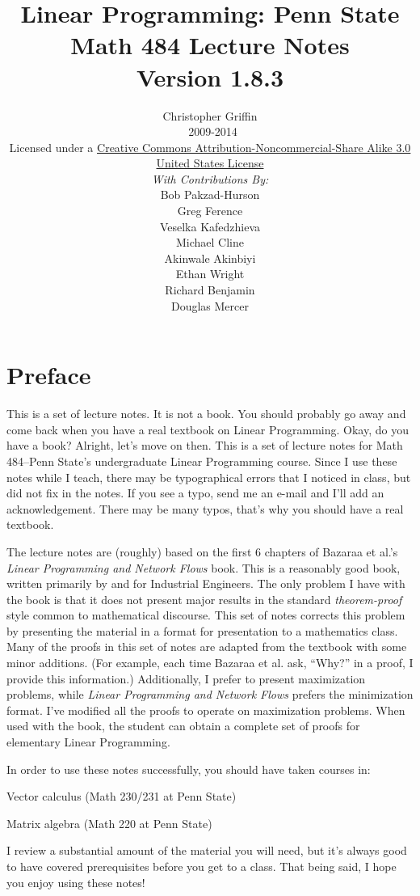\documentclass[leqno,fleqn,12pt,titlepage]{amsbook}
\title{Linear Programming: Penn State Math 484 Lecture Notes\\
		{\small Version 1.8.3}\\
		}
\author{
	Christopher Griffin\\
	\textcopyleft~2009-2014\\
	\vspace*{1em}
	{\scriptsize Licensed under a 
	\href{http://creativecommons.org/licenses/by-nc-sa/3.0/us/}
	{Creative Commons Attribution-Noncommercial-Share Alike 3.0 United States License}}
	\\
	{\small \textit{With Contributions By:}\\
	Bob Pakzad-Hurson\\ Greg Ference\\ Veselka Kafedzhieva\\ Michael Cline\\
	Akinwale Akinbiyi\\Ethan Wright\\
	Richard Benjamin\\
	Douglas Mercer\\}
	
	
}
\date{}
\numberwithin{equation}{chapter}
\numberwithin{figure}{chapter}
\theoremstyle{definition}
\theoremstyle{remark}
\begin{document}
\frontmatter


\maketitle
\tableofcontents

\listoffigures


\chapter*{Preface}
This is a set of lecture notes. It is not a book. You should probably go away and come back when you have a real textbook on Linear Programming. Okay, do you have a book? Alright, let's move on then. This is a set of lecture notes for Math 484--Penn State's undergraduate Linear Programming course. Since I use these notes while I teach, there may be typographical errors that I noticed in class, but did not fix in the notes. If you see a typo, send me an e-mail and I'll add an acknowledgement. There may be many typos, that's why you should have a real textbook.

The lecture notes are (roughly) based on the first 6 chapters of Bazaraa et al.'s \textit{Linear Programming and Network Flows} book. This is a reasonably good book, written primarily by and for Industrial Engineers. The only problem I have with the book is that it does not present major results in the standard \textit{theorem-proof} style common to mathematical discourse. This set of notes corrects this problem by presenting the material in a format for presentation to a mathematics class. Many of the proofs in this set of notes are adapted from the textbook with some minor additions. (For example, each time Bazaraa et al. ask, ``Why?'' in a proof, I provide this information.) Additionally, I prefer to present maximization problems, while \textit{Linear Programming and Network Flows} prefers the minimization format. I've modified all the proofs to operate on maximization problems. When used with the book, the student can obtain a complete set of proofs for elementary Linear Programming.

In order to use these notes successfully, you should have taken courses in:
\begin{enumerate*}
\item Vector calculus (Math 230/231 at Penn State)
\item Matrix algebra (Math 220 at Penn State)
\end{enumerate*}
I review a substantial amount of the material you will need, but it's always good to have covered prerequisites before you get to a class. That being said, I hope you enjoy using these notes!
\mainmatter









\backmatter


\end{document}
